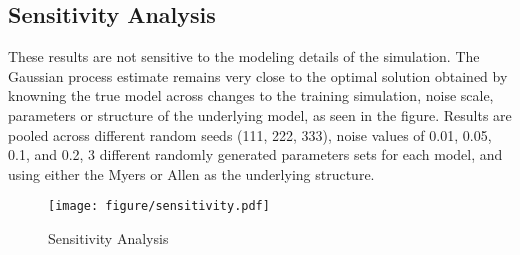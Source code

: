 \documentclass[author-year, review]{elsarticle} %
\makeatletter
\def\maxwidth{\ifdim\Gin@nat@width>\linewidth\linewidth
\else\Gin@nat@width\fi}
\let\Oldincludegraphics\includegraphics
\renewcommand{\includegraphics}[1]{\Oldincludegraphics[width=\maxwidth]{#1}}
\makeatother
\begin{document}
\subsection{Sensitivity Analysis}\label{sensitivity-analysis}

These results are not sensitive to the modeling details of the
simulation. The Gaussian process estimate remains very close to the
optimal solution obtained by knowning the true model across changes to
the training simulation, noise scale, parameters or structure of the
underlying model, as seen in the figure. Results are pooled across
different random seeds (111, 222, 333), noise values of 0.01, 0.05, 0.1,
and 0.2, 3 different randomly generated parameters sets for each model,
and using either the Myers or Allen as the underlying structure.

\begin{figure}[htbp]
\centering
\texttt{[image: figure/sensitivity.pdf]}
\caption{Sensitivity Analysis}
\end{figure}
\end{document}
